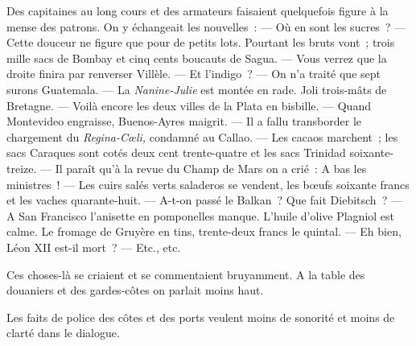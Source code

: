 \documentclass[french,twoside]{book} %
\begin{document}
Des capitaines au long cours et des armateurs faisaient quelquefois figure à la mense des patrons. On y échangeait les nouvelles : — Où en sont les sucres ? — Cette douceur ne figure que pour de petits lots. Pourtant les bruts vont ; trois mille sacs de Bombay et cinq cents boucauts de Sagua. — Vous verrez que la droite finira par renverser Villèle. — Et l’indigo ? — On n’a traité que sept surons Guatemala. — La \emph{Nanine-Julie} est montée en rade. Joli trois-mâts de Bretagne. — Voilà encore les deux villes de la Plata en bisbille. — Quand Montevideo engraisse, Buenos-Ayres maigrit. — Il a fallu transborder le chargement du \emph{Regina-Cœli,} condamné au Callao. — Les cacaos marchent ; les sacs Caraques sont cotés deux cent trente-quatre et les sacs Trinidad soixante-treize. — Il paraît qu’à la revue du Champ de Mars on a crié : A bas les ministres ! — Les cuirs salés verts saladeros se vendent, les bœufs soixante francs et les vaches quarante-huit. — A-t-on passé le Balkan ? Que fait Diebitsch ? — A San Francisco l’anisette en pomponelles manque. L’huile d’olive Plagniol est calme. Le fromage de Gruyère en tins, trente-deux francs le quintal. — Eh bien, Léon XII est-il mort ? — Etc., etc.\par
Ces choses-là se criaient et se commentaient  bruyamment. A la table des douaniers et des gardes-côtes on parlait moins haut.\par
Les faits de police des côtes et des ports veulent moins de sonorité et moins de clarté dans le dialogue.\par
\end{document}
